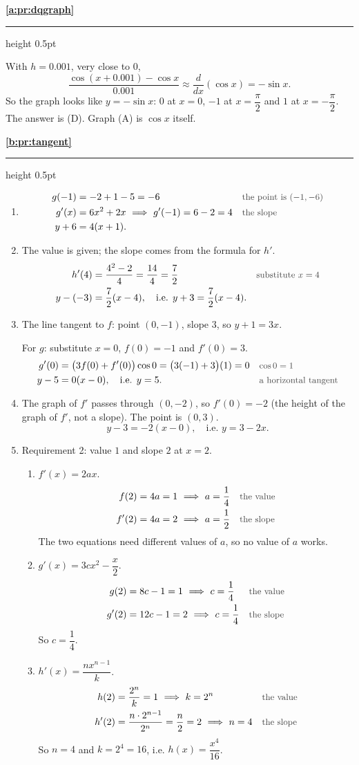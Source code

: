 \documentclass[11pt,a4paper]{article}
\newcommand{\solitem}[2]{%
 \par\addvspace{16pt}\Needspace{10\baselineskip}%
 {\large\bfseries \ref{#1}}\par\nobreak\vspace{2pt}%
 {\color{rulegray}\hrule height 0.5pt}\nobreak\vspace{7pt}%
 #2\par}
\newcommand{\why}[1]{\text{\small\color{darkgray}#1}}
\newcommand{\imp}{\ \Longrightarrow\ }
\begin{document}
\solitem{a:pr:dqgraph}{%
With $h=0.001$, very close to $0$,
\[
\frac{\cos(x+0.001)-\cos x}{0.001}\approx\frac{d}{dx}(\cos x)=-\sin x.
\]
So the graph looks like $y=-\sin x$: $0$ at $x=0$, $-1$ at $x=\dfrac{\pi}{2}$ and $1$ at $x=-\dfrac{\pi}{2}$. The answer is (D). Graph (A) is $\cos x$ itself.
}

\solitem{b:pr:tangent}{%
\begin{enumerate}[label=(\alph*)]
 \item
 \begin{align*}
 g(-1)&=-2+1-5=-6 &&\why{the point is $(-1,-6)$}\\
 g'(x)&=6x^2+2x\imp g'(-1)=6-2=4 &&\why{the slope}\\
 y+6&=4(x+1).
 \end{align*}
 \item The value is given; the slope comes from the formula for $h'$.
 \begin{align*}
 h'(4)&=\frac{4^2-2}{4}=\frac{14}{4}=\frac72 &&\why{substitute $x=4$}\\
 y-(-3)&=\frac72(x-4),\quad\text{i.e. } y+3=\frac72(x-4).
 \end{align*}
 \item The line tangent to $f$: point $(0,-1)$, slope $3$, so $y+1=3x$.

 For $g$: substitute $x=0$, $f(0)=-1$ and $f'(0)=3$.
 \begin{align*}
 g'(0)&=\bigl(3f(0)+f'(0)\bigr)\cos0=\bigl(3(-1)+3\bigr)(1)=0 &&\why{$\cos0=1$}\\
 y-5&=0(x-0),\quad\text{i.e. } y=5. &&\why{a horizontal tangent}
 \end{align*}
 \item The graph of $f'$ passes through $(0,-2)$, so $f'(0)=-2$ (the height of the graph of $f'$, not a slope). The point is $(0,3)$.
 \[
 y-3=-2(x-0),\quad\text{i.e. } y=3-2x.
 \]
 \item Requirement 2: value $1$ and slope $2$ at $x=2$.
 \begin{enumerate}[label=(\roman*)]
  \item $f'(x)=2ax$.
  \begin{align*}
  f(2)&=4a=1\imp a=\frac14 &&\why{the value}\\
  f'(2)&=4a=2\imp a=\frac12 &&\why{the slope}
  \end{align*}
  The two equations need different values of $a$, so no value of $a$ works.
  \item $g'(x)=3cx^2-\dfrac x2$.
  \begin{align*}
  g(2)&=8c-1=1\imp c=\frac14 &&\why{the value}\\
  g'(2)&=12c-1=2\imp c=\frac14 &&\why{the slope}
  \end{align*}
  So $c=\dfrac14$.
  \item $h'(x)=\dfrac{nx^{n-1}}{k}$.
  \begin{align*}
  h(2)&=\frac{2^n}{k}=1\imp k=2^n &&\why{the value}\\
  h'(2)&=\frac{n\cdot2^{n-1}}{2^n}=\frac n2=2\imp n=4 &&\why{the slope}
  \end{align*}
  So $n=4$ and $k=2^4=16$, i.e. $h(x)=\dfrac{x^4}{16}$.


\end{enumerate}
\end{enumerate}}
\end{document}
